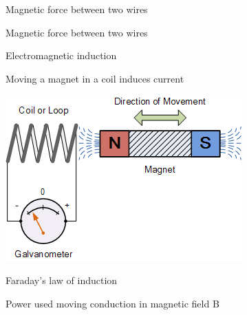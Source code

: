 \documentclass[compress]{beamer}
\begin{document}

{
    \begin{frame}{Magnetic force between two wires}
    \end{frame}
}


{
    \begin{frame}{Magnetic force between two wires}
    \end{frame}
}


\begin{frame}{Electromagnetic induction}

  Moving a magnet in a coil induces current


    \begin{center}
        \includegraphics[width=0.6\linewidth]{../part2/figs/image29}


    \end{center}
\end{frame}


{
    \begin{frame}{Faraday's law of induction}
    \end{frame}
}


{
    \begin{frame}{Power used moving conduction in magnetic field B}
    \end{frame}
}
\end{document}
